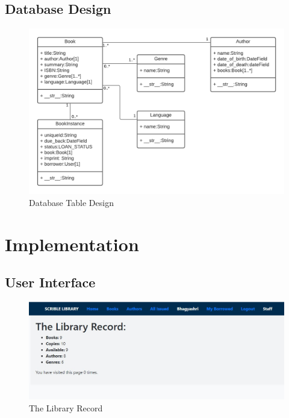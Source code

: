\newpage
\section{Database Design}
\begin{figure}[htb]
	\centering
	\includegraphics[scale=0.8]{./models} 
	\caption{Database Table Design}
	\label{fig:label} 
\end{figure}

\newpage
\chapter{Implementation}
\section{User Interface}
\begin{figure}[htb]
	\centering
	\includegraphics[scale=0.8]{./home} 
	\caption{The Library Record}
	\label{fig:label} 
\end{figure}

